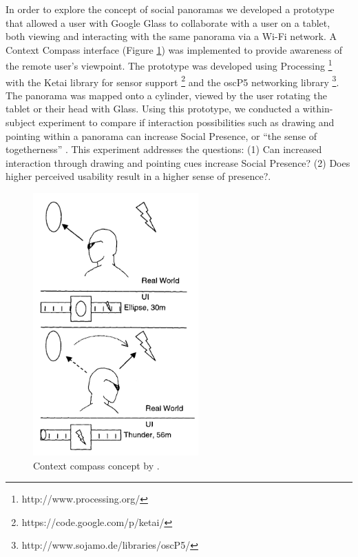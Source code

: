 In order to explore the concept of social panoramas we developed a prototype that allowed a user with Google Glass to collaborate with a user on a tablet, both viewing and interacting with the same panorama via a Wi-Fi network. A Context Compass interface \cite{Suomela2000} (Figure \ref{fig:ismar14:context-compass}) was implemented to provide awareness of the remote user's viewpoint. The prototype was developed using Processing \footnote{http://www.processing.org/} with the Ketai library for sensor support \footnote{https://code.google.com/p/ketai/} and the oscP5 networking library \footnote{http://www.sojamo.de/libraries/oscP5/}. The panorama was mapped onto a cylinder, viewed by the user rotating the tablet or their head with Glass. Using this prototype, we conducted a within-subject experiment to compare if interaction possibilities such as drawing and pointing within a panorama can increase Social Presence, or “the sense of togetherness” \cite{Basdogan2001}. This experiment addresses the questions: (1) Can increased interaction through drawing and pointing cues increase Social Presence? (2) Does higher perceived usability result in a higher sense of presence?. 

\begin{figure}[ht]
	\centering
	\includegraphics[width=2.5in]{images/ismar14/context-compass.PNG}
	\caption{Context compass concept by \cite{Suomela2000}.}
	\label{fig:ismar14:context-compass}
\end{figure}


